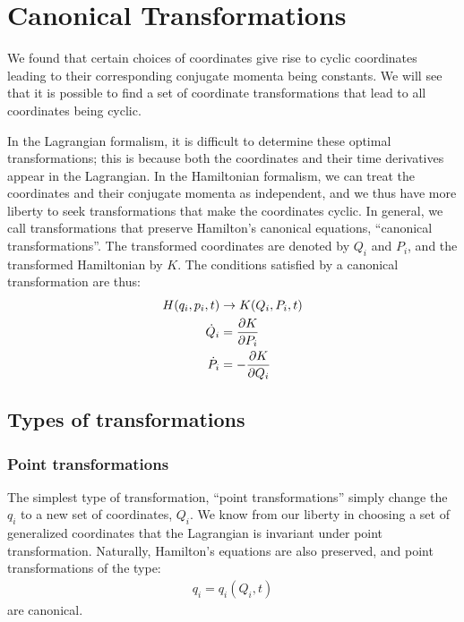%
\chapter{Canonical Transformations}
We found that certain choices of coordinates give rise to cyclic coordinates leading to their corresponding conjugate momenta being constants. We will see that it is possible to find a set of coordinate transformations that lead to all coordinates being cyclic.

In the Lagrangian formalism, it is difficult to determine these optimal transformations; this is because both the coordinates and their time derivatives appear in the Lagrangian. In the Hamiltonian formalism, we can treat the coordinates and their conjugate momenta as independent, and we thus have more liberty to seek transformations that make the coordinates cyclic. In general, we call transformations that preserve Hamilton's canonical equations, ``canonical transformations''. The transformed coordinates are denoted by $Q_i$ and $P_i$, and the transformed Hamiltonian by $K$. The conditions satisfied by a canonical transformation are thus:
\begin{align}
H(q_i,p_i,t)&\to K(Q_i,P_i,t)\nonumber\\
\dot Q_i&=\frac{\partial K}{\partial P_i}\nonumber\\
\dot P_i&=-\frac{\partial K}{\partial Q_i}
\end{align}

\section{Types of transformations}
\subsection{Point transformations}
The simplest type of transformation, ``point transformations'' simply change the $q_i$ to a new set of coordinates, $Q_i$. We know from our liberty in choosing a set of generalized coordinates that the Lagrangian is invariant under point transformation. Naturally, Hamilton's equations are also preserved, and point transformations of the type:
\begin{align}
q_i=q_i(Q_i,t)
\end{align}
are canonical.
